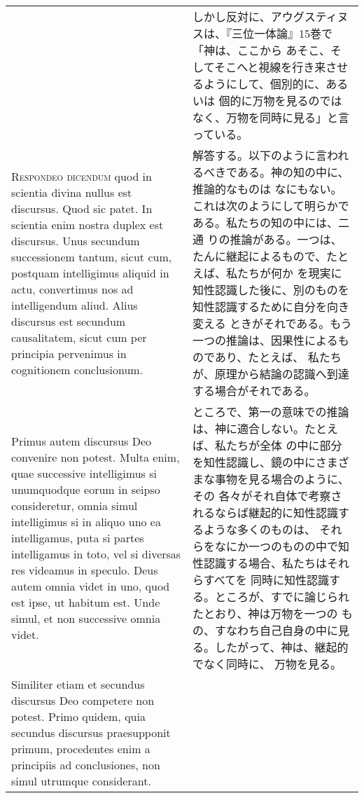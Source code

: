 \documentclass[10pt]{jsarticle} %
\begin{document}
\begin{longtable}{p{21em}p{21em}}
&

しかし反対に、アウグスティヌスは、『三位一体論』15巻で「神は、ここから
あそこ、そしてそこへと視線を行き来させるようにして、個別的に、あるいは
個的に万物を見るのではなく、万物を同時に見る」と言っている。

\\


{\scshape Respondeo dicendum} quod in scientia divina nullus est
discursus. Quod sic patet. In scientia enim nostra duplex est
discursus. Unus secundum successionem tantum, sicut cum, postquam
intelligimus aliquid in actu, convertimus nos ad intelligendum aliud.
Alius discursus est secundum causalitatem, sicut cum per principia
pervenimus in cognitionem conclusionum.

&


解答する。以下のように言われるべきである。神の知の中に、推論的なものは
なにもない。これは次のようにして明らかである。私たちの知の中には、二通
りの推論がある。一つは、たんに継起によるもので、たとえば、私たちが何か
を現実に知性認識した後に、別のものを知性認識するために自分を向き変える
ときがそれである。もう一つの推論は、因果性によるものであり、たとえば、
私たちが、原理から結論の認識へ到達する場合がそれである。

\\

Primus autem discursus Deo convenire non potest. Multa enim, quae
successive intelligimus si unumquodque eorum in seipso consideretur,
omnia simul intelligimus si in aliquo uno ea intelligamus, puta si
partes intelligamus in toto, vel si diversas res videamus in
speculo. Deus autem omnia videt in uno, quod est ipse, ut habitum est.
Unde simul, et non successive omnia videt.

&

ところで、第一の意味での推論は、神に適合しない。たとえば、私たちが全体
の中に部分を知性認識し、鏡の中にさまざまな事物を見る場合のように、その
各々がそれ自体で考察されるならば継起的に知性認識するような多くのものは、
それらをなにか一つのものの中で知性認識する場合、私たちはそれらすべてを
同時に知性認識する。ところが、すでに論じられたとおり、神は万物を一つの
もの、すなわち自己自身の中に見る。したがって、神は、継起的でなく同時に、
万物を見る。


\\

Similiter etiam et secundus discursus Deo competere non potest. Primo
quidem, quia secundus discursus praesupponit primum, procedentes enim
a principiis ad conclusiones, non simul utrumque considerant.


\end{longtable}
\end{document}
